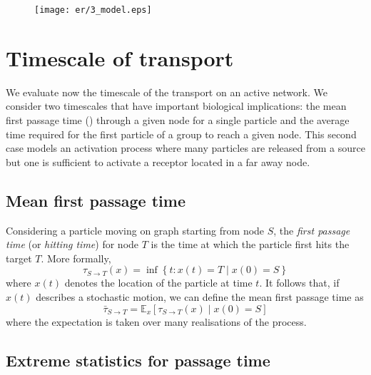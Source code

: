 \begin{figure}
  \texttt{[image: er/3\_model.eps]}
\end{figure}

\section{Timescale of transport}

We evaluate now the timescale of the transport on an active network. We consider two timescales that have important biological implications: the mean first passage time () through a given node for a single particle and the average time required for the first particle of a group to reach a given node. This second case models an activation process where many particles are released from a source but one is sufficient to activate a receptor located in a far away node.

\subsection{Mean first passage time}

Considering a particle moving on graph starting from node $S$, the \emph{first passage time} (or \emph{hitting time}) for node $T$ is the time at which the particle first hits the target $T$. More formally,
\begin{equation}
  \tau_{S \to T}(x) = \inf \left\{ t: x(t) = T \mid x(0) = S \right\}
\end{equation}
where $x(t)$ denotes the location of the particle at time $t$.
It follows that, if $x(t)$ describes a stochastic motion, we can define the mean first passage time as
\begin{equation}
  \bar{\tau}_{S \to T} = \mathbb{E}_x\left[\tau_{S \to T}(x) \mid x(0) = S\right]
\end{equation}
where the expectation is taken over many realisations of the process.


\subsection{Extreme statistics for passage time}

